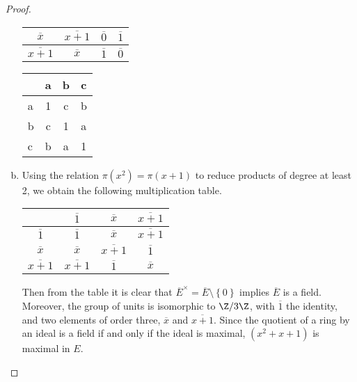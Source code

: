 \documentclass[10pt]{amsart}
\begin{document}
\begin{thm}
\begin{proof}
\begin{enumerate}[(a)]
\begin{center}
\begin{tabular}{|c||c|c|c|}
        \hline
        $\overline{x}$ & $\overline{x+1}$ & $\overline{0}$ & $\overline{1}$\\
        \hline
        $\overline{x + 1}$ & $\overline{x}$ & $\overline{1}$ & $\overline{0}$\\
        \hline
      \end{tabular}
      \quad
      \begin{tabular}{|l||c|c|c|}
        \hline
        & a & b & c\\
        \hline
        \hline
        a & 1 & c & b\\
        \hline
        b & c & 1 & a\\
        \hline
        c & b & a & 1\\
        \hline
      \end{tabular}
      \end{center}
    \item
      Using the relation $\pi(x^2) = \pi(x+1)$ to reduce products of degree at least 2, we obtain the following multiplication table.\\
      \begin{center}
        \begin{tabular}{|c||c|c|c|}
        \hline
        & $\overline{1}$ & $\overline{x}$ & $\overline{x + 1}$\\
        \hline
        \hline
        $\overline{1}$ & $\overline{1}$ & $\overline{x}$ & $\overline{x+1}$\\
        \hline
        $\overline{x}$ & $\overline{x}$ & $\overline{x + 1}$ & $\overline{1}$\\
        \hline
        $\overline{x + 1}$ & $\overline{x + 1}$ & $\overline{1}$ & $\overline{x}$\\
        \hline
      \end{tabular}
      \end{center}
      Then from the table it is clear that $\overline{E}^\times = \overline{E}\setminus\left\{0\right\}$ implies $\overline{E}$ is a field.
      Moreover, the group of units is isomorphic to $\Z/3\Z$, with $\overline{1}$ the identity, and two elements of order three, $\overline{x}$ and $\overline{x+1}$.
      Since the quotient of a ring by an ideal is a field if and only if the ideal is maximal, $(x^2 + x + 1)$ is maximal in $E$. 
    \end{enumerate}
  \end{proof}
\end{thm}
\end{document}
